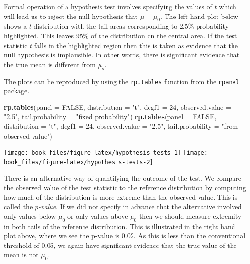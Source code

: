 \documentclass[
]{book}
\newenvironment{Shaded}{\begin{snugshade}}{\end{snugshade}}
\newcommand{\AttributeTok}[1]{\textcolor[rgb]{0.13,0.29,0.53}{#1}}
\newcommand{\ConstantTok}[1]{\textcolor[rgb]{0.56,0.35,0.01}{#1}}
\newcommand{\DecValTok}[1]{\textcolor[rgb]{0.00,0.00,0.81}{#1}}
\newcommand{\FunctionTok}[1]{\textcolor[rgb]{0.13,0.29,0.53}{\textbf{#1}}}
\newcommand{\NormalTok}[1]{#1}
\newcommand{\StringTok}[1]{\textcolor[rgb]{0.31,0.60,0.02}{#1}}
\begin{document}
Formal operation of a hypothesis test involves specifying the values of \(t\) which will lead us to reject the null hypothesis that \(\mu = \mu_0\). The left hand plot below shows a \(t\)-distribution with the tail areas corresponding to 2.5\% probability highlighted. This leaves 95\% of the distribution on the central area. If the test statistic \(t\) falls in the highlighted region then this is taken as evidence that the null hypothesis is implausible. In other words, there is significant evidence that the true mean is different from \(\mu_o\).

The plots can be reproduced by using the \texttt{rp.tables} function from the \texttt{rpanel} package.

\begin{Shaded}
\begin{Highlighting}[]
   \FunctionTok{rp.tables}\NormalTok{(}\AttributeTok{panel =} \ConstantTok{FALSE}\NormalTok{, }\AttributeTok{distribution =} \StringTok{"t"}\NormalTok{, }\AttributeTok{degf1 =} \DecValTok{24}\NormalTok{, }\AttributeTok{observed.value =} \StringTok{"2.5"}\NormalTok{,}
             \AttributeTok{tail.probability =} \StringTok{"fixed probability"}\NormalTok{)}
   \FunctionTok{rp.tables}\NormalTok{(}\AttributeTok{panel =} \ConstantTok{FALSE}\NormalTok{, }\AttributeTok{distribution =} \StringTok{"t"}\NormalTok{, }\AttributeTok{degf1 =} \DecValTok{24}\NormalTok{, }\AttributeTok{observed.value =} \StringTok{"2.5"}\NormalTok{,}
             \AttributeTok{tail.probability =} \StringTok{"from observed value"}\NormalTok{)}
\end{Highlighting}
\end{Shaded}

\texttt{[image: book\_files/figure-latex/hypothesis-tests-1]} \texttt{[image: book\_files/figure-latex/hypothesis-tests-2]}

There is an alternative way of quantifying the outcome of the test. We compare the observed value of the test statistic to the reference distribution by computing how much of the distribution is more extreme than the observed value. This is called the \emph{p-value}. If we did not specify in advance that the alternative involved only values below \(\mu_0\) or only values above \(\mu_0\) then we should measure extremity in both tails of the reference distribution. This is illustrated in the right hand plot above, where we see the p-value is 0.02. As this is less than the conventional threshold of 0.05, we again have significant evidence that the true value of the mean is not \(\mu_0\).
\end{document}
